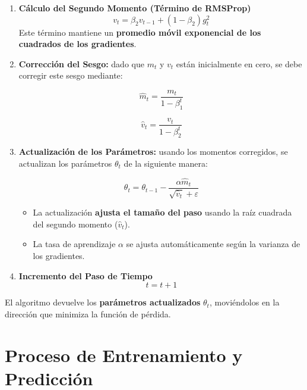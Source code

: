 \begin{itemize}
\begin{enumerate}
    \item \textbf{Cálculo del Segundo Momento (Término de RMSProp)}
    \begin{equation}
        v_t = \beta_2 v_{t-1} + (1 - \beta_2) g_t^2
    \end{equation}
    Este término mantiene un \textbf{promedio móvil exponencial de los cuadrados de los gradientes}.

    \item \textbf{Corrección del Sesgo:}
    dado que \( m_t \) y \( v_t \) están inicialmente en cero, se debe corregir este sesgo mediante:

    \begin{equation}
        \hat{m}_t = \frac{m_t}{1 - \beta_1^t}
    \end{equation}

    \begin{equation}
        \hat{v}_t = \frac{v_t}{1 - \beta_2^t}
    \end{equation}

    \item \textbf{Actualización de los Parámetros:}
    usando los momentos corregidos, se actualizan los parámetros \( \theta_t \) de la siguiente manera:

    \begin{equation}
        \theta_t = \theta_{t-1} - \frac{\alpha \hat{m}_t}{\sqrt{\hat{v}_t} + \varepsilon}
    \end{equation}

    \begin{itemize}
        \item La actualización \textbf{ajusta el tamaño del paso} usando la raíz cuadrada del segundo momento (\( \hat{v}_t \)).
        \item La tasa de aprendizaje \( \alpha \) se ajusta automáticamente según la varianza de los gradientes.
    \end{itemize}

    \item \textbf{Incremento del Paso de Tiempo}
    \begin{equation}
        t = t + 1
    \end{equation}
\end{enumerate}


El algoritmo devuelve los \textbf{parámetros actualizados} \( \theta_t \), moviéndolos en la dirección que minimiza la función de pérdida.


\section{Proceso de Entrenamiento y Predicción}


\end{itemize}
